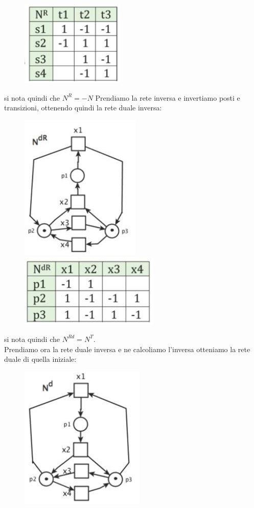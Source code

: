 \documentclass[a4paper,12pt, oneside]{book}
\begin{document}
\begin{esempio}
\begin{figure}[H]
    \includegraphics[scale = 0.6]{img/dr6.jpg}
  \end{figure}
  si nota quindi che $N^R=-N$
  \newpage
  Prendiamo la rete inversa e invertiamo posti e transizioni, ottenendo quindi
  la rete duale inversa:
  \begin{figure}[H]
    \centering
    \includegraphics[scale = 0.5]{img/dr8.jpg}
    \includegraphics[scale = 0.6]{img/dr7.jpg}
  \end{figure}
  si nota quindi che $N^{Rd}=N^T$.\\
  Prendiamo ora la rete duale inversa e ne calcoliamo l'inversa otteniamo la
  rete duale di quella iniziale:
  \begin{figure}[H]
    \centering
    \includegraphics[scale = 0.5]{img/dr4.jpg}

\end{figure}
\end{esempio}
\end{document}
